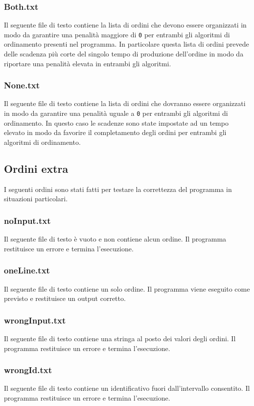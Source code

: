 \documentclass[a4paper]{article}
\begin{document}
\subsubsection{Both.txt}
Il seguente file di testo contiene la lista di ordini che devono essere organizzati in
modo da garantire una penalità maggiore di \texttt{0} per entrambi gli algoritmi di
ordinamento presenti nel programma. In particolare questa lista di ordini prevede delle
scadenza più corte del singolo tempo di produzione dell'ordine in modo da riportare una
penalità elevata in entrambi gli algoritmi.

\subsubsection{None.txt}
Il seguente file di testo contiene la lista di ordini che dovranno essere organizzati in
modo da garantire una penalità uguale a \texttt{0} per entrambi gli algoritmi di
ordinamento. In questo caso le scadenze sono state impostate ad un tempo elevato in modo
da favorire il completamento degli ordini per entrambi gli algoritmi di ordinamento.

\subsection{Ordini extra}
I seguenti ordini sono stati fatti per testare la correttezza del programma in situazioni
particolari.

\subsubsection{noInput.txt}
Il seguente file di testo è vuoto e non contiene alcun ordine. Il programma restituisce
un errore e termina l'esecuzione.

\subsubsection{oneLine.txt}
Il seguente file di testo contiene un solo ordine. Il programma viene eseguito come
previsto e restituisce un output corretto.

\subsubsection{wrongInput.txt}
Il seguente file di testo contiene una stringa al posto dei valori degli ordini. Il
programma restituisce un errore e termina l'esecuzione.

\subsubsection{wrongId.txt}
Il seguente file di testo contiene un identificativo fuori dall'intervallo consentito.
Il programma restituisce un errore e termina l'esecuzione.
\end{document}
